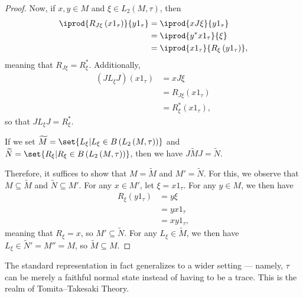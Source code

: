 \documentclass[10pt]{mypackage}
\begin{document}
\begin{proof}
  Now, if $x,y\in M$ and $\xi\in L_2\left( M,\tau \right)$, then
  \begin{align*}
    \iprod{R_{J\xi}\left( x1_{\tau} \right)}{y1_{\tau}} &= \iprod{xJ\xi}{y1_{\tau}}\\
                                                        &= \iprod{y^{\ast}x1_{\tau}}{\xi}\\
                                                        &= \iprod{x1_{\tau}}{R_{\xi}\left( y1_{\tau} \right)},
  \end{align*}
  meaning that $R_{J\xi} = R_{\xi}^{\ast}$. Additionally,
  \begin{align*}
    \left( JL_{\xi}J \right)\left( x1_{\tau} \right) &= xJ\xi\\
                                                     &= R_{J\xi} \left( x1_{\tau} \right)\\
                                                     &= R_{\xi}^{\ast}\left( x1_{\tau} \right),
  \end{align*}
  so that $JL_{\xi}J = R_{\xi}^{\ast}$.

  If we set $ \widetilde{M} = \set{L_{\xi} | L_{\xi}\in B\left( L_2\left( M,\tau \right) \right)} $ and $ \widetilde{N} = \set{R_{\xi} | R_{\xi}\in B\left( L_2\left( M,\tau \right) \right)} $, then we have $J \widetilde{M}J = \widetilde{N}$.

  Therefore, it suffices to show that $M = \widetilde{M}$ and $M' = \widetilde{N}$. For this, we observe that $M\subseteq \widetilde{M}$ and $ \widetilde{N}\subseteq M' $. For any $x\in M'$, let $\xi = x1_{\tau}$. For any $y\in M$, we then have
  \begin{align*}
    R_{\xi}\left( y1_{\tau} \right) &= y\xi\\
                                    &= yx1_{\tau}\\
                                    &= xy1_{\tau},
  \end{align*}
  meaning that $R_{\xi} = x$, so $M'\subseteq \widetilde{N}$. For any $L_{\xi}\in \widetilde{M}$, we then have $L_{\xi}\in \widetilde{N}' = M'' = M$, so $\widetilde{M}\subseteq M$.
\end{proof}
The standard representation in fact generalizes to a wider setting --- namely, $\tau$ can be merely a faithful normal state instead of having to be a trace. This is the realm of Tomita--Takesaki Theory.
\end{document}
